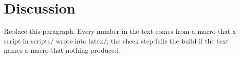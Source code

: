 \section{Discussion}

Replace this paragraph. Every number in the text comes from a macro that a script in scripts/ wrote into latex/;
the check step fails the build if the text names a macro that nothing produced.

